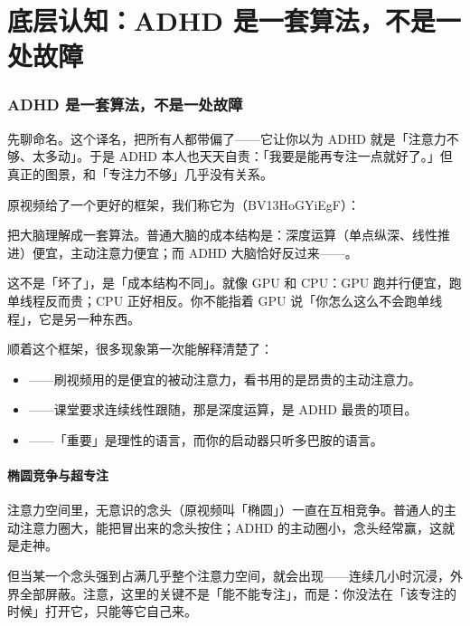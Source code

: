 \part{底层认知：ADHD 是一套算法，不是一处故障}

\section{ADHD 是一套算法，不是一处故障}

先聊命名。这个译名，把所有人都带偏了——它让你以为 ADHD 就是「注意力不够、太多动」。于是 ADHD 本人也天天自责：「我要是能再专注一点就好了。」但真正的图景，和「专注力不够」几乎没有关系。

原视频给了一个更好的框架，我们称它为（BV13HoGYiEgF）：

把大脑理解成一套算法。普通大脑的成本结构是：深度运算（单点纵深、线性推进）便宜，主动注意力便宜；而 ADHD 大脑恰好反过来——。

这不是「坏了」，是「成本结构不同」。就像 GPU 和 CPU：GPU 跑并行便宜，跑单线程反而贵；CPU 正好相反。你不能指着 GPU 说「你怎么这么不会跑单线程」，它是另一种东西。

顺着这个框架，很多现象第一次能解释清楚了：

\begin{itemize}
  \item {}——刷视频用的是便宜的被动注意力，看书用的是昂贵的主动注意力。
  \item {}——课堂要求连续线性跟随，那是深度运算，是 ADHD 最贵的项目。
  \item {}——「重要」是理性的语言，而你的启动器只听多巴胺的语言。
\end{itemize}

\subsection{椭圆竞争与超专注}

注意力空间里，无意识的念头（原视频叫「椭圆」）一直在互相竞争。普通人的主动注意力圈大，能把冒出来的念头按住；ADHD 的主动圈小，念头经常赢，这就是走神。

但当某一个念头强到占满几乎整个注意力空间，就会出现——连续几小时沉浸，外界全部屏蔽。注意，这里的关键不是「能不能专注」，而是：你没法在「该专注的时候」打开它，只能等它自己来。


